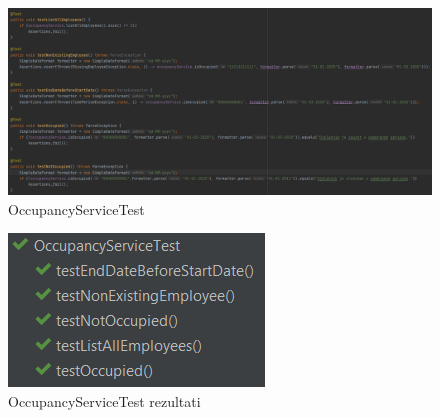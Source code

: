 				
				\begin{figure}[H] 					\centering 				\includegraphics[width=\textwidth]{Dokumentacija/ispit-komp/OccupancyServiceTest.png}
				\caption{OccupancyServiceTest}
				\end{figure}
                \begin{figure}[H] 					\centering 					                    \includegraphics[width=\textwidth]{Dokumentacija/ispit-komp/OccupancyServiceTest - rezultati.png}
				\caption{OccupancyServiceTest rezultati}
				\end{figure}
				
				
				
